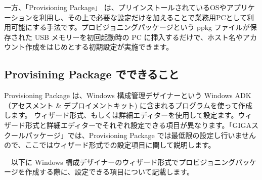 一方、「Provisioning Package」 は、プリインストールされているOSやアプリケーションを利用し、その上で必要な設定だけを加えることで業務用PCとして利用可能にする手法です。プロビジョニングパッケージという ppkg ファイルが保存された USB メモリーを初回起動時の PC に挿入するだけで、ホスト名やアカウント作成をはじめとする初期設定が実施できます。\\

\subsection{Provisining Package でできること}
\label{sec:ProvisioningPackageできること}

Provisioning Package は、Windows 構成管理デザイナーという Windows ADK （アセスメント \& デプロイメントキット) に含まれるプログラムを使って作成します。 ウィザード形式、もしくは詳細エディターを使用して設定ます。ウィザード形式と詳細エディターでそれぞれ設定できる項目が異なります。「GIGAスクールパッケージ」では、Provisioning Package では最低限の設定し行いませんので、ここではウィザード形式での設定項目に関して説明します。

　以下に Windows 構成デザイナーのウィザード形式でプロビジョニングパッケージを作成する際に、設定できる項目について記載します。

